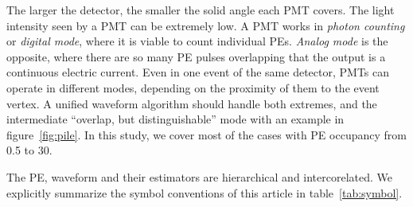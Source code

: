 The larger the detector, the smaller the solid angle each PMT covers.  The light intensity seen by a PMT can be extremely low.  A PMT works in \textit{photon counting} or \textit{digital mode}, where it is viable to count individual PEs.  \textit{Analog mode} is the opposite, where there are so many PE pulses overlapping that the output is a continuous electric current.  Even in one event of the same detector, PMTs can operate in different modes, depending on the proximity of them to the event vertex.  A unified waveform algorithm should handle both extremes, and the intermediate ``overlap, but distinguishable'' mode with an example in figure~\ref{fig:pile}.  In this study,  we cover most of the cases with PE occupancy from 0.5 to 30.

The PE, waveform and their estimators are hierarchical and intercorelated.  We explicitly summarize the symbol conventions of this article in table~\ref{tab:symbol}.

